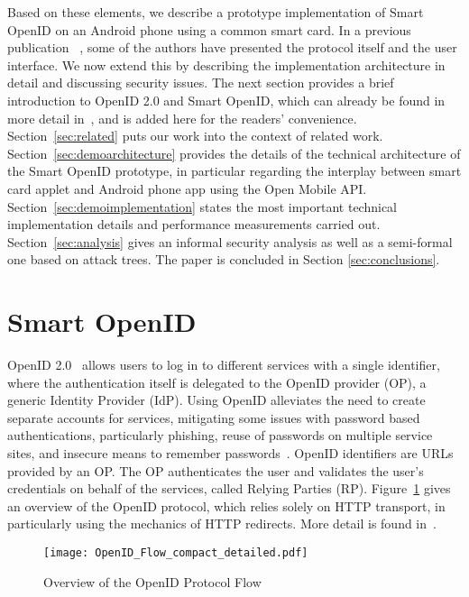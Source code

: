 \documentclass[runningheads,a4paper]{llncs}
\begin{document}
Based on these elements, we describe a prototype implementation of Smart OpenID on an Android phone using a common smart card. 
 In a previous publication ~\cite{SmartOpenIDIFIP12}, some of the authors have presented the protocol itself and the user interface. We now extend this by describing the implementation architecture in detail and discussing security issues. The next section provides a brief introduction to OpenID 2.0 and Smart OpenID, which can already be found in more detail in~\cite{SmartOpenIDIFIP12}, and is added here for the readers' convenience. Section~\ref{sec:related} puts our work into the context of related work. Section~\ref{sec:demoarchitecture} provides the details of the technical architecture of the Smart OpenID prototype, in particular regarding the interplay between smart card applet and Android phone app using the Open Mobile API. Section~\ref{sec:demoimplementation} states the most important technical implementation details and performance measurements carried out.
Section~\ref{sec:analysis} gives an informal security analysis as well as a semi-formal one based on attack trees.
The paper is concluded in Section \ref{sec:conclusions}.

\section{Smart OpenID}
OpenID 2.0~\cite{OpenIDSpecs} allows users to log in to different services with a single identifier, where the authentication itself is delegated to the OpenID provider (OP), a generic Identity Provider (IdP). 
Using OpenID alleviates the need to create separate accounts for services, mitigating some issues with password based authentications, particularly phishing, reuse of passwords on multiple service sites, and insecure means to remember passwords~\cite{uruena2010analysis,van2008simple}.
OpenID identifiers are URLs provided by an OP.
The OP authenticates the user and validates the user's credentials on behalf of the services, called Relying Parties (RP). 
Figure~\ref{fig:OpenIDProtocol} gives an overview of the OpenID protocol, which relies solely on HTTP transport, in particularly using the mechanics of HTTP redirects. More detail is found in~\cite{SmartOpenIDIFIP12}.

\begin{figure}[t]
 \centering
  \texttt{[image: OpenID\_Flow\_compact\_detailed.pdf]}
 \caption{Overview of the OpenID Protocol Flow}
  \label{fig:OpenIDProtocol}
\end{figure}
\end{document}
